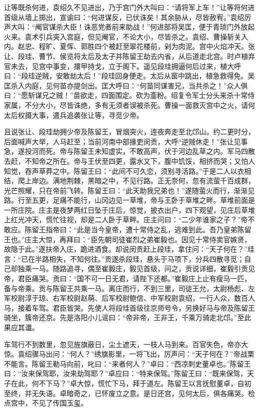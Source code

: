 让等既杀何进，袁绍久不见进出，乃于宫门外大叫曰：“请将军上车！”让等将何进首级从墙上掷出，宣谕曰：“何进谋反，已伏诛矣！其余胁从，尽皆赦宥。”袁绍厉声大叫：“阉官谋杀大臣！诛恶党者前来助战！”何进部将吴匡，便于青琐门外放起火来。袁术引兵突入宫庭，但见阉官，不论大小，尽皆杀之。袁绍、曹操斩关入内。赵忠、程旷、夏恽、郭胜四个被赶至翠花楼前，剁为肉泥。宫中火焰冲天。张让、段珪、曹节、侯览将太后及太子并陈留王劫去内省，从后道走北宫。时卢植弃官未去，见宫中事变，擐甲持戈，立于阁下。遥见段珪拥逼何后过来，植大呼曰：“段珪逆贼，安敢劫太后！”段珪回身便走。太后从窗中跳出，植急救得免。吴匡杀入内庭，见何苗亦提剑出。匡大呼曰：“何苗同谋害兄，当共杀之！”众人俱曰：“愿斩谋兄之贼！”苗欲走，四面围定。砍为齑粉。绍复令军士分头来杀十常侍家属，不分大小，尽皆诛绝，多有无须者误被杀死。曹操一面救灭宫中之火，请何太后权摄大事，遣兵追袭张让等，寻觅少帝。

且说张让、段珪劫拥少帝及陈留王，冒烟突火，连夜奔走至北邙山。约二更时分，后面喊声大举，人马赶至；当前河南中部掾吏闵贡，大呼“逆贼休走！”张让见事急，遂投河而死。帝与陈留王未知虚实，不敢高声，伏于河边乱草之内。军马四散去赶，不知帝之所在。帝与王伏至四更，露水又下，腹中饥馁，相挤而哭；又怕人知觉，吞声草莽之中。陈留王曰：“此间不可久恋，须别寻活路。”于是二人以衣相结，爬上岸边。满地荆棘，黑暗之中，不见行路。正无奈何，忽有流萤千百成群，光芒照耀，只在帝前飞转。陈留王曰：“此天助我兄弟也！”遂随萤火而行，渐渐见路。行至五更，足痛不能行，山冈边见一草堆，帝与王卧于草堆之畔。草堆前面是一所庄院。庄主是夜梦两红日坠于庄后，惊觉，披衣出户，四下观望，见庄后草堆上红光冲天，慌忙往视，却是二人卧于草畔。庄主问曰：“二少年谁家之子？”帝不敢应。陈留王指帝曰：“此是当今皇帝，遭十常侍之乱，逃难到此。吾乃皇弟陈留王也。”庄主大惊，再拜曰：“臣先朝司徒崔烈之弟崔毅也。因见十常侍卖官嫉贤，故隐于此。”遂扶帝入庄，跪进酒食。却说闵贡赶上段珪，拿住问：“天子何在？”珪言：“已在半路相失，不知何往。”贡遂杀段珪，悬头于马项下，分兵四散寻觅；自己却独乘一马。随路追寻，偶至崔毅庄，毅见首级，问之，贡说详细，崔毅引贡见帝，君臣痛哭。贡曰：“国不可一日无君，请陛下还都。”崔毅庄上止有瘦马一匹，备与帝乘。贡与陈留王共乘一马。离庄而行，不到三里，司徒王允，太尉杨彪、左军校尉淳于琼、右军校尉赵萌、后军校尉鲍信、中军校尉袁绍，一行人众，数百人马，接着车驾。君臣皆哭。先使人将段珪首级往京师号令，另换好马与帝及陈留王骑坐，簇帝还京。先是洛阳小儿谣曰：“帝非帝，王非王，千乘万骑走北邙。”至此果应其谶。

车驾行不到数里，忽见旌旗蔽日，尘土遮天，一枝人马到来。百官失色，帝亦大惊。袁绍骤马出问：“何人？”绣旗影里，一将飞出，厉声问：“天子何在？”帝战栗不能言。陈留王勒马向前，叱曰：“来者何人？”卓曰：“西凉刺史董卓也。”陈留王曰：“汝来保驾耶，汝来劫驾耶？”卓应曰：“特来保驾。”陈留王曰：“既来保驾，天子在此，何不下马？”卓大惊，慌忙下马，拜于道左。陈留王以言抚慰董卓，自初至终，并无失语。卓暗奇之，已怀废立之意。是日还宫，见何太后，俱各痛哭。检点宫中，不见了传国玉玺。

